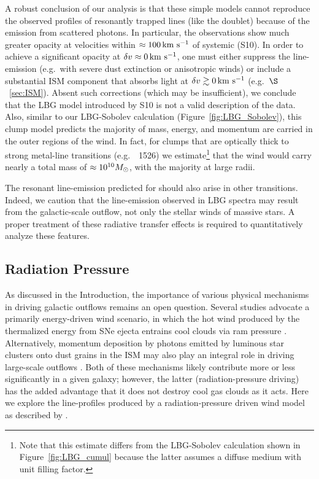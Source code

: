 \documentclass[12pt,preprint]{aastex}
\begin{document}
A robust conclusion of our
analysis is that these simple models cannot reproduce the
observed profiles of resonantly trapped lines (like the 
doublet) because of the emission from scattered photons.  
In particular, the observations show much greater opacity at
velocities within $\approx 100 \, {\rm km~s^{-1}}$ of systemic (S10).
In order to
achieve a significant opacity at $\delta v \approx 0 \, {\rm km~s^{-1}}$, one must
either suppress the line-emission (e.g.\ with severe dust extinction
or anisotropic winds) 
or include a substantial ISM component that absorbs light at $\delta v
\gtrsim 0 \, {\rm km~s^{-1}}$ (e.g.\ $\S$~\ref{sec:ISM}).  
Absent such corrections (which may be insufficient),
we conclude that the LBG model
introduced by S10 is not a valid description of the data.  Also,
similar to our LBG-Sobolev calculation (Figure~\ref{fig:LBG_Sobolev}),
this clump model predicts the majority of mass, energy, and momentum are
carried in the outer regions of the wind. 
In fact, for clumps that are optically thick to strong metal-line
transitions (e.g.\ ~1526) we estimate\footnote{Note that
  this estimate differs from the LBG-Sobolev calculation shown in
  Figure~\ref{fig:LBG_cumul} because the latter assumes a diffuse
  medium with unit filling factor.}
that the wind would
carry nearly a total mass of $\approx 10^{10} M_\odot$, with the
majority at large radii.


The resonant line-emission predicted for  should also arise
in other transitions.  Indeed, we caution that the 
line-emission observed in LBG spectra
\citep[e.g.][]{prs+02} may result from the galactic-scale outflow, not
only the stellar winds of massive stars.
A proper treatment of these radiative transfer effects is required to
quantitatively analyze these features.

\subsection{Radiation Pressure}
\label{sec:radiative}

As discussed in the Introduction, the importance of various physical mechanisms
in driving galactic outflows remains an open
question.  Several studies advocate a primarily energy-driven
wind scenario, in which the hot wind produced by the thermalized
energy from SNe ejecta entrains cool clouds via ram pressure \citep[e.g.][]{cc85,ham90,sh09}.
Alternatively, momentum deposition by photons emitted by luminous star clusters onto
dust grains in the ISM may also play an integral role in driving
large-scale outflows \citep[e.g.][]{mqt05,mmt10}.  Both of these
mechanisms likely contribute more or less significantly in a given
galaxy; however, the latter (radiation-pressure driving) has the added
advantage that it does not destroy cool gas clouds as it acts.  Here
we explore the line-profiles produced by a radiation-pressure driven
wind model as described by \cite{mqt05}.
\end{document}
